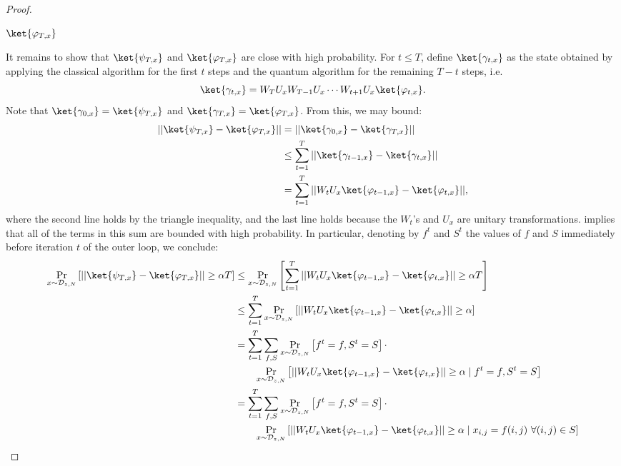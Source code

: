\documentclass[10pt,a4paper]{article}
\begin{document}
\begin{proof}
\begin{algorithm}
\Return $\ket{\varphi_{T,x}}$
\end{algorithm}

It remains to show that $\ket{\psi_{T,x}}$ and $\ket{\varphi_{T,x}}$ are close with high probability. For $t \le T$, define $\ket{\gamma_{t,x}}$ as the state obtained by applying the classical algorithm for the first $t$ steps and the quantum algorithm for the remaining $T - t$ steps, i.e.
\[
\ket{\gamma_{t,x}} = W_TU_xW_{T-1}U_x\cdots W_{t+1}U_x\ket{\varphi_{t,x}}.
\]
Note that $\ket{\gamma_{0,x}} = \ket{\psi_{T,x}}$ and $\ket{\gamma_{T,x}} = \ket{\varphi_{T,x}}$. From this, we may bound:
\begin{align}
||\ket{\psi_{T,x}} - \ket{\varphi_{T,x}}|| &= ||\ket{\gamma_{0,x}} - \ket{\gamma_{T,x}}||\nonumber\\
&\le \sum_{t=1}^T ||\ket{\gamma_{t-1,x}} - \ket{\gamma_{t,x}}||\nonumber\\
&= \sum_{t=1}^T ||W_tU_x\ket{\varphi_{t-1,x}} - \ket{\varphi_{t,x}}||\label{eq:sparse_aa_hybrid},
\end{align}
where the second line holds by the triangle inequality, and the last line holds because the $W_t$'s and $U_x$ are unitary transformations.  implies that all of the terms in this sum are bounded with high probability. In particular, denoting by $f^t$ and $S^t$ the values of $f$ and $S$ immediately before iteration $t$ of the outer loop,
we conclude:
\begin{align*}
\Pr_{x \sim \mathcal{D}_{z,N}}\left[||\ket{\psi_{T,x}} - \ket{\varphi_{T,x}}|| \ge \alpha T\right] &\le \Pr_{x \sim \mathcal{D}_{z,N}}\left[\sum_{t=1}^T ||W_tU_x\ket{\varphi_{t-1,x}} - \ket{\varphi_{t,x}}|| \ge \alpha T\right]\\
&\le \sum_{t=1}^T \Pr_{x \sim \mathcal{D}_{z,N}}\left[||W_tU_x\ket{\varphi_{t-1,x}} - \ket{\varphi_{t,x}}|| \ge \alpha\right]\\
&= \sum_{t=1}^T \sum_{f,S}\Pr_{x \sim \mathcal{D}_{z,N}}\left[f^t = f, S^t = S\right] \cdot \\
&\qquad\Pr_{x \sim \mathcal{D}_{z,N}}\left[||W_tU_x\ket{\varphi_{t-1,x}} - \ket{\varphi_{t,x}}|| \ge \alpha \mid f^t = f, S^t = S\right]\\
&= \sum_{t=1}^T \sum_{f,S}\Pr_{x \sim \mathcal{D}_{z,N}}\left[f^t = f, S^t = S\right] \cdot \\
&\qquad\Pr_{x \sim \mathcal{D}_{z,N}}\left[||W_tU_x\ket{\varphi_{t-1,x}} - \ket{\varphi_{t,x}}|| \ge \alpha \mid x_{i,j} = f(i,j)\ \forall (i, j) \in S\right]\\

\end{align*}
\end{proof}
\end{document}
